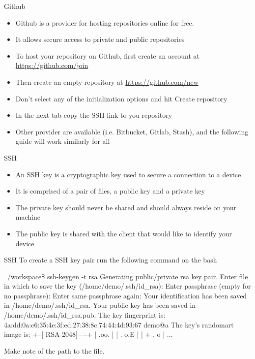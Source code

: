 \begin{frame}[fragile]{Github}
    \begin{itemize}[<+->] 
        \item Github is a provider for hosting repositories online for free.
        \item It allows secure access to private and public repositories
        \item To host your repository on Github, first create an account at \url{https://github.com/join}
        \item Then create an empty repository at \url{https://github.com/new}
        \item Don't select any of the initialization options and hit \alert{Create repository}
        \item In the next tab copy the \alert{SSH} link to you repository
        \item Other provider are available (i.e. Bitbucket, Gitlab, Stash), and the following guide will work similarly for all
    \end{itemize}
\end{frame}

\begin{frame}[fragile]{SSH}
\begin{itemize}[<+->] 
    \item An SSH key is a cryptographic key used to secure a connection to a device
    \item It is comprised of a pair of files, a public key and a private key
    \item The private key should never be shared and should always reside on your machine
    \item The public key is shared with the client that would like to identify your device
\end{itemize}
\end{frame}

\begin{frame}[fragile]{SSH\insertcontinuationtext}
    To create a SSH key pair run the following command on the bash
    \begin{shellblock}
~/workspace\$ ssh-keygen -t rsa
Generating public/private rsa key pair.
Enter file in which to save the key (/home/demo/.ssh/id_rsa): 
Enter passphrase (empty for no passphrase): 
Enter same passphrase again: 
Your identification has been saved in /home/demo/.ssh/id_rsa.
Your public key has been saved in /home/demo/.ssh/id_rsa.pub.
The key fingerprint is:
4a:dd:0a:c6:35:4e:3f:ed:27:38:8c:74:44:4d:93:67 demo@a
The key's randomart image is:
+--[ RSA 2048]----+
|          .oo.   |
|         .  o.E  |
|        + .  o   |
...
    \end{shellblock}
Make note of the path to the  file.
\end{frame}

